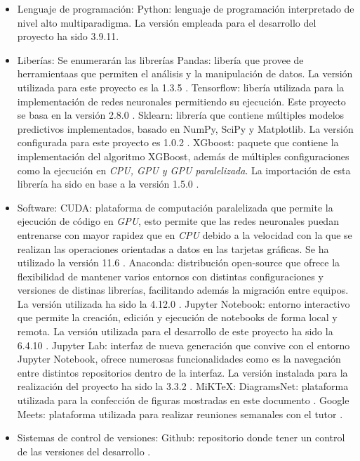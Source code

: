             \begin{itemize}
                \item Lenguaje de programación:
                    \subitem Python: lenguaje de programación interpretado de nivel alto multiparadigma. La versión empleada para el desarrollo del proyecto ha sido 3.9.11.
                \item Liberías: Se enumerarán las librerías 
                    \subitem Pandas: libería que provee de herramientaas que permiten el análisis y la manipulación de datos. La versión utilizada para este proyecto es la 1.3.5 \cite{Pandas}. 
                    \subitem Tensorflow: libería utilizada para la implementación de redes neuronales permitiendo su ejecución. Este proyecto se basa en la versión 2.8.0 \cite{Tensorflow}.
                    \subitem Sklearn: librería que contiene múltiples modelos predictivos implementados, basado en NumPy, SciPy y Matplotlib. La versión configurada para este proyecto es 1.0.2 \cite{Scikit-Learn}.
                    \subitem XGboost: paquete que contiene la implementación del algoritmo XGBoost, además de múltiples configuraciones como la ejecución en \textit{CPU, GPU y GPU paralelizada}. La importación de esta librería ha sido en base a la versión 1.5.0 \cite{XGBoostLibrary}.
                \item Software:
                    \subitem CUDA: plataforma de computación paralelizada que permite la ejecución de código en \textit{GPU}, esto permite que las redes neuronales puedan entrenarse con mayor rapidez que en \textit{CPU} debido a la velocidad con la que se realizan las operaciones orientadas a datos en las tarjetas gráficas. Se ha utilizado la versión 11.6 \cite{CUDA}. 
                    \subitem Anaconda: distribución open-source que ofrece la flexibilidad de mantener varios entornos con distintas configuraciones y versiones de distinas librerías, facilitando además la migración entre equipos. La versión utilizada ha sido la 4.12.0 \cite{Anaconda}.
                    \subitem Jupyter Notebook: entorno interactivo que permite la creación, edición y ejecución de notebooks de forma local y remota. La versión utilizada para el desarrollo de este proyecto ha sido la 6.4.10 \cite{JupyterNotebook}.
                    \subitem Jupyter Lab: interfaz de nueva generación que convive con el entorno Jupyter Notebook, ofrece numerosas funcionalidades como es la navegación entre distintos repositorios dentro de la interfaz. La versión instalada para la realización del proyecto ha sido la 3.3.2 \cite{JupyterLab}.
                    \subitem MiKTeX:
                    \subitem DiagramsNet: plataforma utilizada para la confección de figuras mostradas en este documento \cite{DiagramsNet}. 
                    \subitem Google Meets: plataforma utilizada para realizar reuniones semanales con el tutor \cite{GoogleMeet}.
                \item Sistemas de control de versiones:
                    \subitem Github: repositorio donde tener un control de las versiones del desarrollo \cite{Github}.
                    
            \end{itemize}


